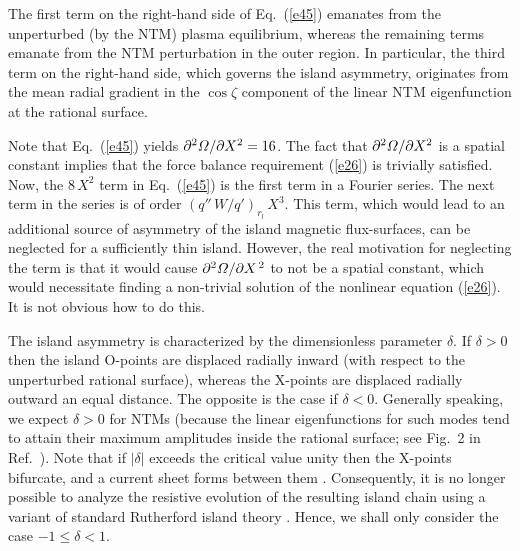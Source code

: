 \documentclass{iopjournal}
\begin{document}
{The first term on the right-hand side of Eq.~(\ref{e45}) emanates from the unperturbed (by the NTM) plasma equilibrium, whereas the
remaining terms emanate from the NTM perturbation in the outer region. In particular, the third term on the right-hand
side, which governs the island asymmetry,  originates from  the mean radial gradient in the $\cos\zeta$ component of the linear NTM eigenfunction at the rational surface. 

Note that Eq.~(\ref{e45}) yields $\partial^2{\mit\Omega}/\partial X^{2}=16$. The fact that $\partial^2{\mit\Omega}/\partial X^{2}$ 
is a spatial constant implies that the force balance requirement (\ref{e26}) is trivially satisfied. Now, the $8\,X^{2}$ term in Eq.~(\ref{e45}) is
the first term in a Fourier series. The next term in the series is of order $(q''\,W/q')_{r_l}\,X^{3}$. This term, which would lead to an additional source of
asymmetry of the island magnetic flux-surfaces, can be neglected for a sufficiently thin island.
However, the real motivation for neglecting the term is that it would cause $\partial^2{\mit\Omega}/\partial X^{\,2}$ to not be a spatial
constant, which would necessitate finding a non-trivial solution of the nonlinear equation (\ref{e26}). It is not obvious how to do this. 

The island asymmetry is characterized by the dimensionless parameter $\delta$. If $\delta >0$ then the island O-points are displaced radially inward (with respect to the unperturbed rational
surface), whereas the X-points are displaced radially outward an equal distance. The opposite is the case if $\delta <0$. Generally speaking,  we
expect $\delta>0$ for NTMs (because the linear eigenfunctions for such modes tend to attain their
maximum amplitudes inside the rational surface; 
see Fig.~2 in Ref.~\cite{white}). 
Note that if  $|\delta|$ exceeds the critical value
unity then the X-points bifurcate, and a current sheet forms between them \cite{wal}.  Consequently,  it is no longer possible to analyze the resistive evolution of the  resulting island chain  using a variant of standard Rutherford island theory \cite{ntm1}. Hence, we shall only consider the case $-1\leq \delta < 1$. 

}
\end{document}
